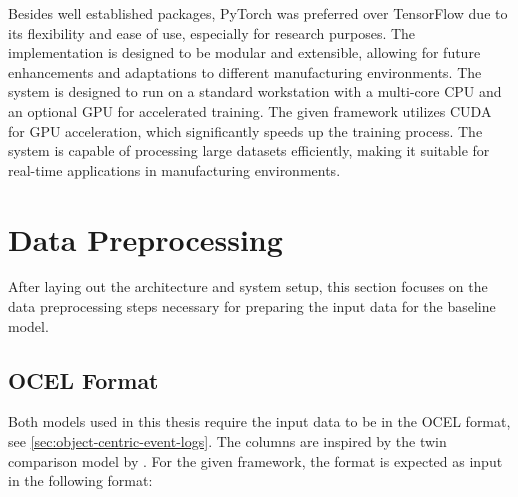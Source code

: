 Besides well established packages, PyTorch was preferred over TensorFlow due to its flexibility and ease of use, especially for research purposes. The implementation is designed to be modular and extensible, allowing for future enhancements and adaptations to different manufacturing environments.
The system is designed to run on a standard workstation with a multi-core CPU and an optional GPU for accelerated training. The given framework utilizes CUDA \autocite{NVIDIA_CUDA} for GPU acceleration, which significantly speeds up the training process. The system is capable of processing large datasets efficiently, making it suitable for real-time applications in manufacturing environments.


\section*{Data Preprocessing}
\label{sec:event_log_processing}

After laying out the architecture and system setup, this section focuses on the data preprocessing steps necessary for preparing the input data for the baseline model.

\subsection{OCEL Format}

Both models used in this thesis require the input data to be in the OCEL format, see \autoref{sec:object-centric-event-logs}. The columns are inspired by the twin comparison model by \autocite{schwede2024learning}. For the given framework, the format is expected as input in the following format:

